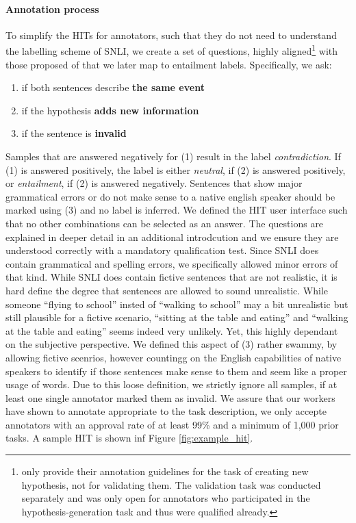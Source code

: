 \paragraph*{Annotation process}
To simplify the \ac{HIT}s for annotators, such that they do not need to understand the labelling scheme of \ac{SNLI}, we create a set of questions, highly aligned\footnote{\cite{bowman2015large} only provide their annotation guidelines for the task of creating new hypothesis, not for validating them. The validation task was conducted separately and was only open for annotators who participated in the hypothesis-generation task and thus were qualified already. } with those proposed of \cite{bowman2015large} that we later map to entailment labels. Specifically, we ask:
\begin{enumerate}
\item if both sentences describe \textbf{the same event}
\item if the hypothesis \textbf{adds new information}
\item if the sentence is \textbf{invalid}
\end{enumerate}
Samples that are answered negatively for (1) result in the label \textit{contradiction}. If (1) is answered positively, the label is either \textit{neutral}, if (2) is answered positively, or \textit{entailment}, if (2) is answered negatively. Sentences that show major grammatical errors or do not make sense to a native english speaker should be marked using (3) and no label is inferred. We defined the \ac{HIT} user interface such that no other combinations can be selected as an answer. The questions are explained in deeper detail in an additional introdcution and we ensure they are understood correctly with a mandatory qualification test. Since \ac{SNLI} does contain grammatical and spelling errors, we specifically allowed minor errors of that kind. While \ac{SNLI} does contain fictive sentences that are not realistic, it is hard define the degree that sentences are allowed to sound unrealistic. While someone ``flying to school'' insted of ``walking to school'' may a bit unrealistic but still plausible for a fictive scenario, ``sitting at the table and eating'' and ``walking at the table and eating'' seems indeed very unlikely. Yet, this highly dependant on the subjective perspective. We defined this aspect of (3) rather swammy, by allowing fictive scenrios, however countingg on the English capabilities of native speakers to identify if those sentences make sense to them and seem like a proper usage of words. Due to this loose definition, we strictly ignore all samples, if at least one single annotator marked them as invalid. We assure that our workers have shown to annotate appropriate to the task description, we only accepte annotators with an approval rate of at least 99\% and a minimum of 1,000 prior tasks. A sample \ac{HIT} is shown inf Figure \ref{fig:example_hit}. 
